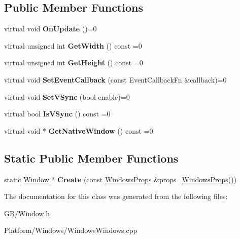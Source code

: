\subsection*{Public Member Functions}
\begin{DoxyCompactItemize}
\item 
\mbox{\label{class_g_b_1_1_window_ab36943fd72679f180be2cfe263be7e26}} 
virtual void {\bfseries On\+Update} ()=0
\item 
\mbox{\label{class_g_b_1_1_window_a20fb15b81a6ee34dc0c90e001ba66f6e}} 
virtual unsigned int {\bfseries Get\+Width} () const =0
\item 
\mbox{\label{class_g_b_1_1_window_aedf055e51c1deff9122eb2146642265d}} 
virtual unsigned int {\bfseries Get\+Height} () const =0
\item 
\mbox{\label{class_g_b_1_1_window_a7951c70110ad6cb16b99b1377fa8b927}} 
virtual void {\bfseries Set\+Event\+Callback} (const Event\+Callback\+Fn \&callback)=0
\item 
\mbox{\label{class_g_b_1_1_window_a211fde3fa308a83f2233bd858ef838af}} 
virtual void {\bfseries Set\+V\+Sync} (bool enable)=0
\item 
\mbox{\label{class_g_b_1_1_window_ab79735d75ebd469c752e30ad23848b6a}} 
virtual bool {\bfseries Is\+V\+Sync} () const =0
\item 
\mbox{\label{class_g_b_1_1_window_af80c03c6861fa823c16a277779e05ad8}} 
virtual void $\ast$ {\bfseries Get\+Native\+Window} () const =0
\end{DoxyCompactItemize}
\subsection*{Static Public Member Functions}
\begin{DoxyCompactItemize}
\item 
\mbox{\label{class_g_b_1_1_window_a7870159bf29618b54003b94f192b1930}} 
static \mbox{\hyperlink{class_g_b_1_1_window}{Window}} $\ast$ {\bfseries Create} (const \mbox{\hyperlink{struct_g_b_1_1_windows_props}{Windows\+Props}} \&props=\mbox{\hyperlink{struct_g_b_1_1_windows_props}{Windows\+Props}}())
\end{DoxyCompactItemize}


The documentation for this class was generated from the following files\+:\begin{DoxyCompactItemize}
\item 
G\+B/Window.\+h\item 
Platform/\+Windows/Windows\+Windows.\+cpp\end{DoxyCompactItemize}
